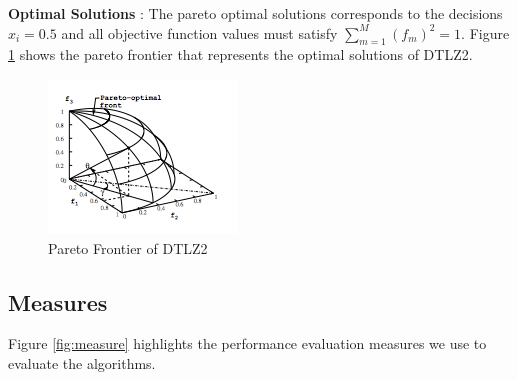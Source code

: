 \documentclass[conference]{IEEEtran}
\begin{document}
\textbf{Optimal Solutions} : The pareto optimal solutions corresponds to the decisions \(x_i = 0.5\) and all objective function values must satisfy \(\sum_{m=1}^M (f_m)^2 = 1\). Figure \ref{fig:problem} shows the pareto frontier that represents the optimal solutions of DTLZ2.

\begin{figure}
\centering
\includegraphics{img/dtlz2_pareto.png}
\caption{Pareto Frontier of DTLZ2}
\label{fig:problem}
\end{figure}

\subsection{Measures}
\label{measures}
Figure \ref{fig:measure} highlights the performance evaluation measures we use to evaluate the algorithms.
\end{document}
